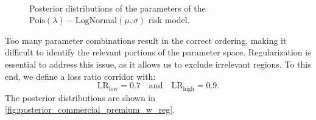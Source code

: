 \documentclass[10pt]{article}
\begin{document}
\begin{figure}[!ht]
  \begin{center}
    \\
    \caption{Posterior distributions of the parameters of the $\text{Pois}(\lambda)-\text{LogNormal}(\mu , \sigma)$ risk model.}
    \label{fig:posterior_commercial_premium_wo_reg}
  \end{center}
\end{figure}

Too many parameter combinations result in the correct ordering, making it difficult to identify the relevant portions of the parameter space. Regularization is essential to address this issue, as it allows us to exclude irrelevant regions. To this end, we define a loss ratio corridor with:  
$$
\text{LR}_{\text{low}} = 0.7 \quad \text{and} \quad \text{LR}_{\text{high}} = 0.9.
$$
The posterior distributions are shown in \cref{fig:posterior_commercial_premium_w_reg}.
\end{document}
